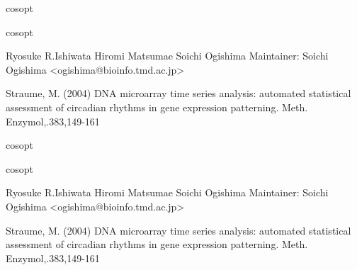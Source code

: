 \documentclass{article}
\begin{document}
\begin{Description}\relax
cosopt
\end{Description}
\begin{Details}\relax
cosopt
\end{Details}
\begin{Author}\relax
Ryosuke R.Ishiwata
Hiromi Matsumae
Soichi Ogishima
Maintainer: Soichi Ogishima <ogishima@bioinfo.tmd.ac.jp>
\end{Author}
\begin{References}\relax
Straume, M. (2004) DNA microarray time series analysis: automated statistical assessment of circadian rhythms in gene expression patterning. Meth. Enzymol,.383,149-161
\end{References}

\begin{Description}\relax
cosopt
\end{Description}
\begin{Details}\relax
cosopt
\end{Details}
\begin{Author}\relax
Ryosuke R.Ishiwata
Hiromi Matsumae
Soichi Ogishima
Maintainer: Soichi Ogishima <ogishima@bioinfo.tmd.ac.jp>
\end{Author}
\begin{References}\relax
Straume, M. (2004) DNA microarray time series analysis: automated statistical assessment of circadian rhythms in gene expression patterning. Meth. Enzymol,.383,149-161
\end{References}
\end{document}
